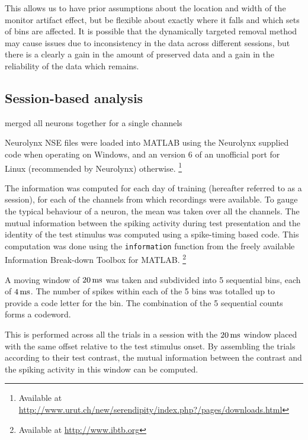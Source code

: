 This allows us to have prior assumptions about the location and width of the monitor artifact effect, but be flexible about exactly where it falls and which sets of bins are affected.
It is possible that the dynamically targeted removal method may cause issues due to inconsistency in the data across different sessions, but there is a clearly a gain in the amount of preserved data and a gain in the reliability of the data which remains.

\FloatBarrier
\subsection{Session-based analysis}

merged all neurons together for a single channels

Neurolynx NSE files were loaded into MATLAB using the Neurolynx supplied code when operating on Windows, and an version 6 of an unofficial port for Linux (recommended by Neurolynx) otherwise.%
\footnote{Available at
\\ \url{http://www.urut.ch/new/serendipity/index.php?/pages/downloads.html}}

The information was computed for each day of training (hereafter referred to as a session), for each of the channels from which recordings were available. To gauge the typical behaviour of a neuron, the mean was taken over all the channels.
The mutual information between the spiking activity during test presentation and the identity of the test stimulus was computed
using a spike-timing based code.
This computation was done using the \verb|information| function from the freely available Information Break-down Toolbox \cite{Magri2009} for MATLAB.%
\footnote{Available at \url{http://www.ibtb.org}}

A moving window of $\unit[20]{ms}$ was taken and subdivided into 5 sequential bins, each of $\unit[4]{ms}$.
The number of spikes within each of the 5 bins was totalled up to provide a code letter for the bin.
The combination of the 5 sequential counts forms a codeword.

This is performed across all the trials in a session with the $\unit[20]{ms}$ window placed with the same offset relative to the test stimulus onset.
By assembling the trials according to their test contrast, the mutual information between the contrast and the spiking activity in this window can be computed.


